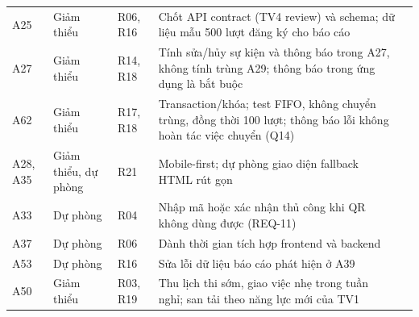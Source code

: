 \begin{landscape}
\begin{longtable}{L{2.19cm}L{2.78cm}L{2.34cm}L{10.83cm}L{1.76cm}}
A25 & Giảm thiểu & R06, R16 & Chốt API contract (TV4 review) và schema; dữ liệu mẫu 500 lượt đăng ký cho báo cáo &  \\
A27 & Giảm thiểu & R14, R18 & Tính sửa/hủy sự kiện và thông báo trong A27, không tính trùng A29; thông báo trong ứng dụng là bắt buộc &  \\
A62 & Giảm thiểu & R17, R18 & Transaction/khóa; test FIFO, không chuyển trùng, đồng thời 100 lượt; thông báo lỗi không hoàn tác việc chuyển (Q14) &  \\
A28, A35 & Giảm thiểu, dự phòng & R21 & Mobile-first; dự phòng giao diện fallback HTML rút gọn &  \\
A33 & Dự phòng & R04 & Nhập mã hoặc xác nhận thủ công khi QR không dùng được (REQ-11) &  \\
A37 & Dự phòng & R06 & Dành thời gian tích hợp frontend và backend &  \\
A53 & Dự phòng & R16 & Sửa lỗi dữ liệu báo cáo phát hiện ở A39 &  \\
A50 & Giảm thiểu & R03, R19 & Thu lịch thi sớm, giao việc nhẹ trong tuần nghỉ; san tải theo năng lực mới của TV1 &  \\
\end{longtable}
\endgroup


\end{landscape}
